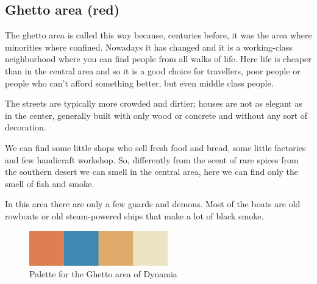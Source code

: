 \subsection{Ghetto area (red)}
The ghetto area is called this way because, centuries before, it was the area where  minorities where confined. Nowadays it has changed and it is a working-class neighborhood where you can find people from all walks of life. Here life is cheaper than in the central area and so it is a good choice for travellers, poor people or people who can't afford something better, but even middle class people.

The streets are typically more crowded and dirtier; houses are not as elegant as in the center, generally built with only wood or concrete and without any sort of decoration.

We can find some little shops who sell fresh food and bread, some little factories and few handicraft workshop. So, differently from the scent of rare spices from the southern desert we can smell in the central area, here we can find only the smell of fish and smoke.

In this area there are only a few guards and demons. Most of the boats are old rowboats or old steam-powered ships that make a lot of black smoke.

\begin{figure}[H]
  \centering
  \includegraphics[width=6cm]{Images/Palettes/dynamiaGhettoArea}
  \caption{Palette for the Ghetto area of Dynamia}
\end{figure}

